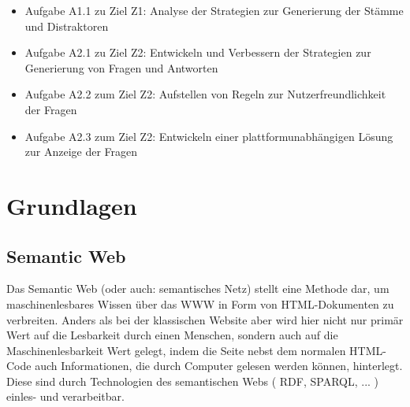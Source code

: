 \documentclass[headsepline,titlepage,ngerman,twoside,12pt]{report}
\newcommand\todo[1]{}%
\begin{document}
\todo{
Beschreiben Sie Ihre Vorgehensweise in einzelnen Schritten und stellen Sie die Reihenfolge der Abarbeitung dar.
Auf diese Punkte sollten Sie in der Diskussion wieder eingehen.
}
\todo{
\begin{enumerate}
\item Schritt 
\item Schritt 
\end{enumerate}
}
\todo{
Vermeiden Sie Formulierungen wie \enquote{Es ist nicht bekannt, ob...} oder \enquote{Es existiert kein...}.
Solche Formulierungen kehren in der Regel einfach das bereits angedachte Lösungsmodell um und postulieren das Fehlen der angedachten Lösung einfach als Problem.
... \\
Schritt n\\
Das ist ähnlich, wie wenn es in der Werbung hieße \enquote{Wenn Sie das Problem haben, dass Ihnen Aspirin fehlt, dann kaufen Sie doch Aspirin.}
Sinnvoller ist diese Aussage: \enquote{Wenn Sie das Problem haben, dass Ihnen der Kopf weh tut, dann kaufen Sie doch Aspirin.}
Es ist also bei der Problembeschreibung erforderlich, sich in die Lage dessen zu versetzen, den man mit der angedachten Lösung beglücken möchte.
Sein Problem ist zu ermitteln und so zu formulieren, er/sie das Problem wiedererkennt und dadurch geneigt ist, sich für die Lösung des Problems zu interessieren.
} 
\begin{itemize}
    \item Aufgabe A1.1 zu Ziel Z1: Analyse der Strategien zur Generierung der Stämme und Distraktoren
    \item Aufgabe A2.1 zu Ziel Z2: Entwickeln und Verbessern der Strategien zur Generierung von Fragen und Antworten
    \item Aufgabe A2.2 zum Ziel Z2: Aufstellen von Regeln zur Nutzerfreundlichkeit der Fragen
    \item Aufgabe A2.3 zum Ziel Z2: Entwickeln einer plattformunabhängigen Lösung zur Anzeige der Fragen
\end{itemize}

\todo{(2--3 Seiten)}
\chapter{Grundlagen}
\label{ch:Grundlagen}

\section{Semantic Web}
\label{sec:semanticweb}
Das Semantic Web (oder auch: semantisches Netz) stellt eine Methode dar, um maschinenlesbares Wissen über das \ac{WWW} in Form von HTML-Dokumenten zu verbreiten.
Anders als bei der klassischen Website aber wird hier nicht nur primär Wert auf die Lesbarkeit durch einen Menschen, sondern auch auf die Maschinenlesbarkeit Wert gelegt, indem die Seite nebst dem normalen HTML-Code auch Informationen, die durch Computer gelesen werden können, hinterlegt. Diese sind durch Technologien des semantischen Webs ( \acs{RDF}, \acs{SPARQL}, ... ) einles- und verarbeitbar. 
\end{document}
